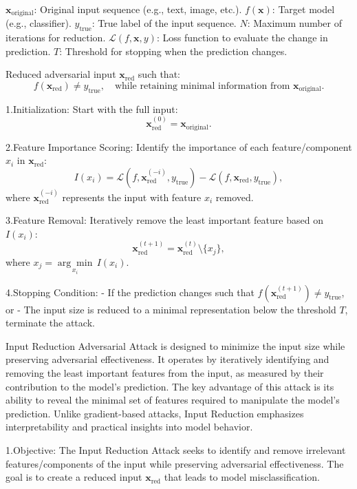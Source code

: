 
$\mathbf{x}_{\text{original}}$: Original input sequence (e.g., text, image, etc.).  
$f(\mathbf{x})$: Target model (e.g., classifier).  
$y_{\text{true}}$: True label of the input sequence.  
$N$: Maximum number of iterations for reduction.  
$\mathcal{L}(f, \mathbf{x}, y)$: Loss function to evaluate the change in prediction.  
$T$: Threshold for stopping when the prediction changes.

Reduced adversarial input $\mathbf{x}_{\text{red}}$ such that:  
\[
f(\mathbf{x}_{\text{red}}) \neq y_{\text{true}}, \quad \text{while retaining minimal information from } \mathbf{x}_{\text{original}}.
\]

1.Initialization:  
   Start with the full input:  
   \[
   \mathbf{x}_{\text{red}}^{(0)} = \mathbf{x}_{\text{original}}.
   \]

2.Feature Importance Scoring:  
   Identify the importance of each feature/component $x_i$ in $\mathbf{x}_{\text{red}}$:  
   \[
   I(x_i) = \mathcal{L}(f, \mathbf{x}_{\text{red}}^{(-i)}, y_{\text{true}}) - \mathcal{L}(f, \mathbf{x}_{\text{red}}, y_{\text{true}}),
   \]
   where $\mathbf{x}_{\text{red}}^{(-i)}$ represents the input with feature $x_i$ removed.

3.Feature Removal:  
   Iteratively remove the least important feature based on $I(x_i)$:  
   \[
   \mathbf{x}_{\text{red}}^{(t+1)} = \mathbf{x}_{\text{red}}^{(t)} \setminus \{x_j\},
   \]
   where $x_j = \underset{x_i}{\arg \min} \, I(x_i)$.

4.Stopping Condition:  
   - If the prediction changes such that $f(\mathbf{x}_{\text{red}}^{(t+1)}) \neq y_{\text{true}}$, or  
   - The input size is reduced to a minimal representation below the threshold $T$, terminate the attack.

Input Reduction Adversarial Attack is designed to minimize the input size while preserving adversarial effectiveness. It operates by iteratively identifying and removing the least important features from the input, as measured by their contribution to the model's prediction. The key advantage of this attack is its ability to reveal the minimal set of features required to manipulate the model's prediction. Unlike gradient-based attacks, Input Reduction emphasizes interpretability and practical insights into model behavior.

1.Objective: The Input Reduction Attack seeks to identify and remove irrelevant features/components of the input while preserving adversarial effectiveness. The goal is to create a reduced input $\mathbf{x}_{\text{red}}$ that leads to model misclassification.

